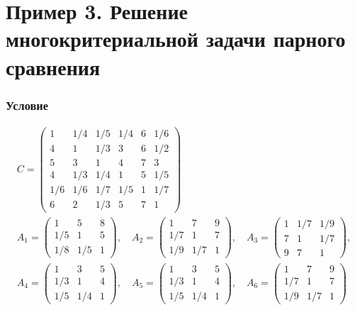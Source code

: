 \documentclass[specialist,
  substylefile = spbu.rtx,
  href,
  colorlinks=true,
  12pt]{disser}
\begin{document}
\section{Пример 3. Решение многокритериальной задачи парного сравнения} \label{appendix:full}

\subsubsection{Условие}
$$
\begin{array}{l}
	C=\left(\begin{array}{cccccc}
		1 & 1 / 4 & 1 / 5 & 1 / 4 & 6 & 1 / 6 \\
		4 & 1 & 1 / 3 & 3 & 6 & 1 / 2 \\
		5 & 3 & 1 & 4 & 7 & 3 \\
		4 & 1 / 3 & 1 / 4 & 1 & 5 & 1 / 5 \\
		1 / 6 & 1 / 6 & 1 / 7 & 1 / 5 & 1 & 1 / 7 \\
		6 & 2 & 1 / 3 & 5 & 7 & 1
	\end{array}\right) \\
	A_{1}=\left(\begin{array}{ccc}
		1 & 5 & 8 \\
		1 / 5 & 1 & 5 \\
		1 / 8 & 1 / 5 & 1
	\end{array}\right), \quad A_{2}=\left(\begin{array}{ccc}
		1 & 7 & 9 \\
		1 / 7 & 1 & 7 \\
		1 / 9 & 1 / 7 & 1
	\end{array}\right), \quad A_{3}=\left(\begin{array}{ccc}
		1 & 1 / 7 & 1 / 9 \\
		7 & 1 & 1 / 7 \\
		9 & 7 & 1
	\end{array}\right), \\
	A_{4}=\left(\begin{array}{ccc}
		1 & 3 & 5 \\
		1 / 3 & 1 & 4 \\
		1 / 5 & 1 / 4 & 1
	\end{array}\right), \quad A_{5}=\left(\begin{array}{ccc}
		1 & 3 & 5 \\
		1 / 3 & 1 & 4 \\
		1 / 5 & 1 / 4 & 1
	\end{array}\right), \quad A_{6}=\left(\begin{array}{ccc}
		1 & 7 & 9 \\
		1 / 7 & 1 & 7 \\
		1 / 9 & 1 / 7 & 1
	\end{array}\right)
\end{array}
$$
\end{document}
